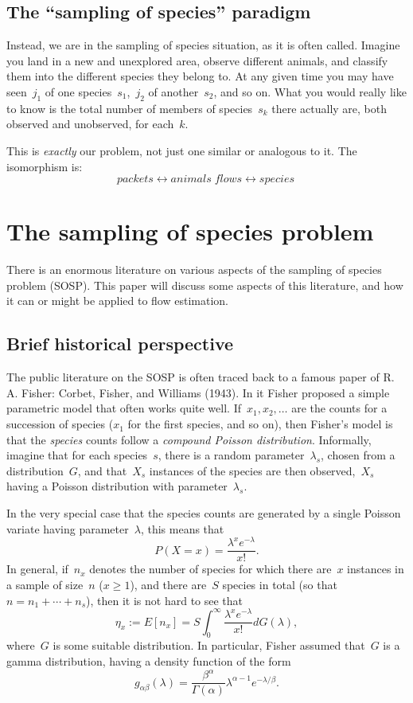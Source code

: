 \documentclass{paper}
\begin{document}
\subsection{The ``sampling of species'' paradigm}

Instead, we are in the sampling of species situation, as it is often called.
Imagine you land in a new and unexplored area, observe different animals, and
classify them into the different species they belong to. At any given time you
may have seen~$j_1$ of one species~$s_1$,~$j_2$ of another~$s_2$, and so on.
What you would really like to know is the total number of members of
species~$s_k$ there actually are, both observed and unobserved, for each~$k$.

This is \emph{exactly} our problem, not just one similar or analogous to it.
The isomorphism is:
$$ packets \longleftrightarrow animals \; flows \longleftrightarrow species~$$

\section{The sampling of species problem}

There is an enormous literature on various aspects of the sampling of species
problem (SOSP). This paper will discuss some aspects of this literature, and how
it can or might be applied to flow estimation.

\subsection{Brief historical perspective}

The public literature on the SOSP is often traced back to a famous paper of R.
A. Fisher: Corbet, Fisher, and Williams (1943). In it Fisher proposed a simple
parametric model that often works quite well. If~$x_1, x_2, \dots$ are the
counts for a succession of species ($x_1$ for the first species, and so on),
then Fisher's model is that the \emph{species} counts follow a \emph{compound
Poisson distribution}. Informally, imagine that for each species~$s$, there is a
random parameter~$\lambda_s$, chosen from a distribution~$G$, and that~$X_s$
instances of the species are then observed,~$X_s$ having a Poisson distribution
with parameter~$\lambda_s$.

In the very special case that the species counts are generated by a single
Poisson variate having parameter~$\lambda$, this means that
$$ P(X = x) = \frac{\lambda^x e^{-\lambda}}{x!}. $$
In general, if~$n_x$ denotes the number of species for which there are~$x$
instances in a sample of size~$n$ ($x \geq 1$), and there are~$S$ species in
total (so that~$n = n_1 + \cdots + n_s$), then it is not hard to see that
$$ \eta_x := E[n_x] = S \int_0^\infty \frac{\lambda^x e^{-\lambda}}{x!} dG(\lambda), $$
where~$G$ is some suitable distribution. In particular, Fisher assumed that~$G$
is a gamma distribution, having a density function of the form
$$ g_{\alpha\beta}(\lambda) = \frac{\beta^\alpha}{\Gamma(\alpha)} \lambda^{\alpha-1}e^{-\lambda/\beta}. $$
\end{document}
